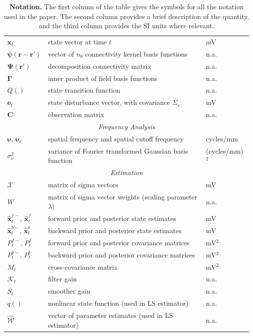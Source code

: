 \documentclass[review,authoryear,3p]{elsarticle}
\begin{document}
\begin{table}[!ht]
\begin{tabular}{|l|l|l|}
   	$\mathbf{x}_t$ & state vector at time $t$ & mV\\
   	$\boldsymbol{\psi}(\mathbf{r}-\mathbf{r}')$ & vector of $n_{\theta}$ connectivity kernel basis functions & n.a.\\
   	$\boldsymbol{\Psi}(\mathbf{r}')$ & decomposition connectivity matrix & n.a.\\
   	$\boldsymbol{\Gamma}$ & inner product of field basis functions & n.a.\\
   	$Q()$ & state transition function & n.a.\\
   	$\mathbf{e}_t$ & state disturbance vector, with covariance $\Sigma_e$ & mV\\
   	$\mathbf{C}$ & observation matrix & n.a. \\
	\hline
	\multicolumn{3}{|c|}{\emph{Frequency Analysis}} \\
	\hline
	$\boldsymbol{\nu}$, $\boldsymbol{\nu}_c$ & spatial frequency and spatial cutoff frequency & cycles/mm \\
	$\sigma_{\nu}^2$ & variance of Fourier transformed Gaussian basis function & (cycles/mm)$^2$\\
	\hline
	\multicolumn{3}{|c|}{\emph{Estimation}} \\
	\hline
	$\mathcal{X}$ & matrix of sigma vectors & mV\\
	$W$ & matrix of sigma vector weights (scaling parameter $\lambda$) & n.a.\\
   	$\hat{\mathbf{x}}_t^{f-}$, $\hat{\mathbf{x}}_t^f$ & forward prior and posterior state estimates & mV\\
   	$\hat{\mathbf{x}}_t^{b-}$, $\hat{\mathbf{x}}_t^{b}$ & backward prior and posterior state estimates & mV\\
 	$P^{f-}_t$, $P^f_t$  & forward prior and posterior covariance matrices & mV$^2$\\
   	$P^{b-}_t$, $P^b_t$ & backward prior and posterior covariance matrices & mV$^2$\\
	$M_t$& cross-covariance matrix & mV$^2$\\
	$\mathcal K_{t} $ & filter gain & n.a.\\
	$S_t$ & smoother gain & n.a.\\
	$q()$ & nonlinear state function (used in LS estimator) & n.a.\\
   	$\mathcal{\hat{W}}$& vector of parameter estimates (used in LS estimator) & n.a.\\	
	\hline
\end{tabular}
\caption{\textbf{Notation.} The first column of the table gives the symbols for all the notation used in the paper. The second column provides a brief description of the quantity, and the third column provides the SI units where relevant.}
\label{tab:Notation}
\end{table}
\end{document}
